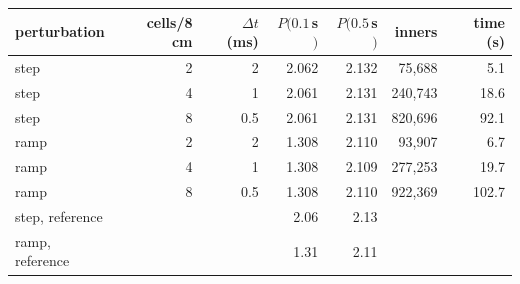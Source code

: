 \begin{tabular}{lrrrrrr}
\hline
perturbation & cells/8 cm & $\Delta t$ (ms) & $P(0.1\,$s$)$ & $P(0.5\,$s$)$ & inners & time (s)\\
\hline
step & 2 & 2 & 2.062 & 2.132 & 75,688 & 5.1\\
step & 4 & 1 & 2.061 & 2.131 & 240,743 & 18.6\\
step & 8 & 0.5 & 2.061 & 2.131 & 820,696 & 92.1\\
ramp & 2 & 2 & 1.308 & 2.110 & 93,907 & 6.7\\
ramp & 4 & 1 & 1.308 & 2.109 & 277,253 & 19.7\\
ramp & 8 & 0.5 & 1.308 & 2.110 & 922,369 & 102.7\\
step, reference &  &  & 2.06 & 2.13 &  & \\
ramp, reference &  &  & 1.31 & 2.11 &  & \\
\hline
\end{tabular}
